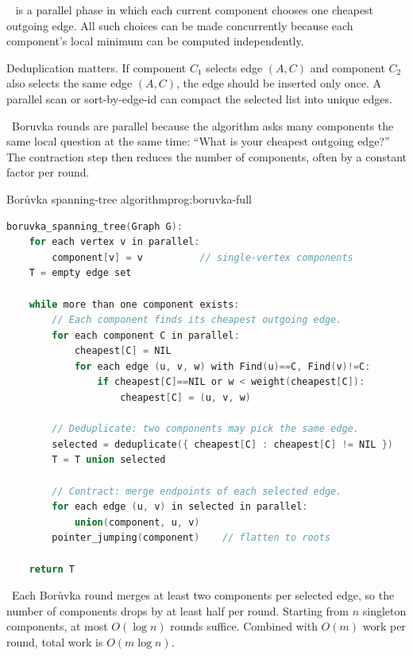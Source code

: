 \begin{ppdefn}
\  is a parallel phase in which each current component chooses one cheapest outgoing edge.
All such choices can be made concurrently because each component's local minimum can be computed independently.
\end{ppdefn}

Deduplication matters.
If component \(C_1\) selects edge \((A,C)\) and component \(C_2\) also selects the same edge \((A,C)\), the edge should be inserted only once.
A parallel scan or sort-by-edge-id can compact the selected list into unique edges.

\begin{ppkey}
\ Boruvka rounds are parallel because the algorithm asks many components the same local question at the same time:
``What is your cheapest outgoing edge?''
The contraction step then reduces the number of components, often by a constant factor per round.
\end{ppkey}

\begin{ppprogram}{Borůvka spanning-tree algorithm}{prog:boruvka-full}
\begin{lstlisting}[language=C]
boruvka_spanning_tree(Graph G):
    for each vertex v in parallel:
        component[v] = v          // single-vertex components
    T = empty edge set

    while more than one component exists:
        // Each component finds its cheapest outgoing edge.
        for each component C in parallel:
            cheapest[C] = NIL
            for each edge (u, v, w) with Find(u)==C, Find(v)!=C:
                if cheapest[C]==NIL or w < weight(cheapest[C]):
                    cheapest[C] = (u, v, w)

        // Deduplicate: two components may pick the same edge.
        selected = deduplicate({ cheapest[C] : cheapest[C] != NIL })
        T = T union selected

        // Contract: merge endpoints of each selected edge.
        for each edge (u, v) in selected in parallel:
            union(component, u, v)
        pointer_jumping(component)    // flatten to roots

    return T
\end{lstlisting}
\end{ppprogram}

\begin{ppnote}
\ Each Borůvka round merges at least two components per selected edge, so the number of components drops by at least half per round.
Starting from \(n\) singleton components, at most \(O(\log n)\) rounds suffice.
Combined with \(O(m)\) work per round, total work is \(O(m \log n)\).
\end{ppnote}

